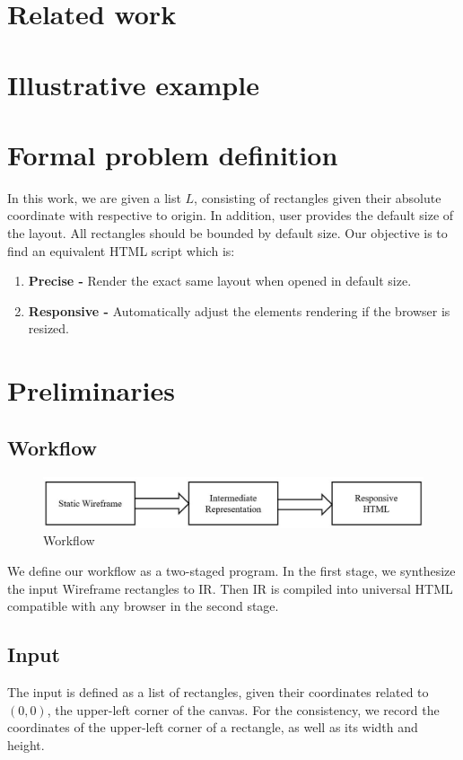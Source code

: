 \documentclass[runningheads]{llncs}
\begin{document}
\section{Related work}

\section{Illustrative example}
\section{Formal problem definition}
In this work, we are given a list $L$, consisting of rectangles given their absolute coordinate with respective to origin. In addition, user provides the default size of the layout. All rectangles should be bounded by default size. Our objective is to find an equivalent HTML script which is: 
\begin{enumerate}
  \item \textbf{Precise -} Render the exact same layout when opened in  default size.
  \item \textbf{Responsive -} Automatically adjust the elements rendering if the browser is resized.
\end{enumerate}
\section{Preliminaries}
\subsection{Workflow}
\begin{figure}[H]
  \vspace*{-0.1in}
  \includegraphics[width=1\textwidth]{src/workflow.JPG}
  \caption{Workflow}
\end{figure}
We define our workflow as a two-staged program. In the first stage, we synthesize the input Wireframe rectangles to IR. Then IR is compiled into universal HTML compatible with any browser in the second stage. 
\subsection{Input}
The input is defined as a list of rectangles, given their coordinates related to $(0,0)$, the upper-left corner of the canvas. For the consistency, we record the coordinates of the upper-left corner of a rectangle, as well as its width and height.
\end{document}
